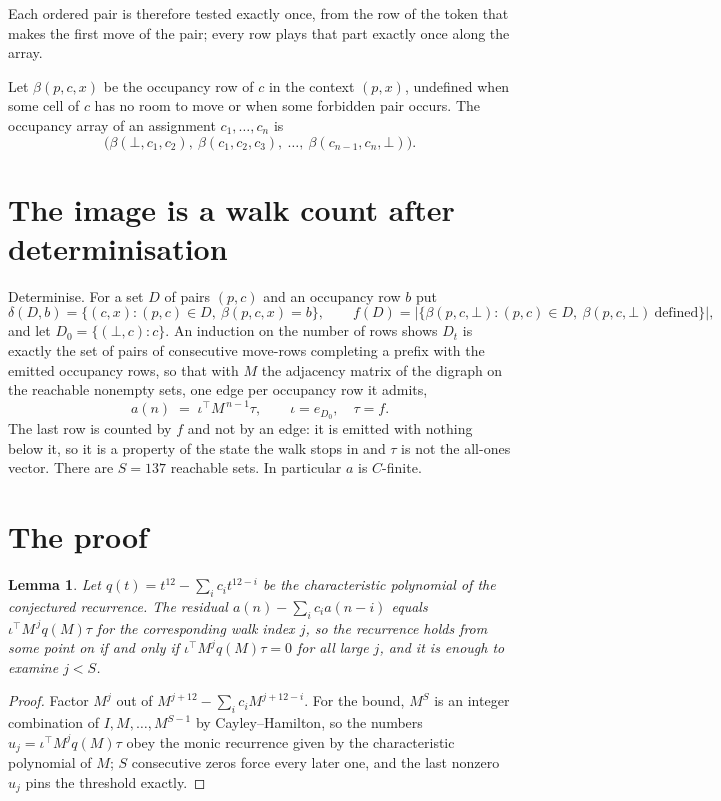 \documentclass[11pt,a4paper]{article}
\theoremstyle{plain}
\newtheorem{lemma}[theorem]{Lemma}
\theoremstyle{definition}
\begin{document}
Each ordered pair is therefore tested exactly once, from the row of the token that makes the
first move of the pair; every row plays that part exactly once along the array.

Let $\beta(p,c,x)$ be the occupancy row of $c$ in the context $(p,x)$, undefined when some
cell of $c$ has no room to move or when some forbidden pair occurs. The occupancy array of an
assignment $c_1,\dots,c_n$ is
\[
\bigl(\beta(\bot,c_1,c_2),\ \beta(c_1,c_2,c_3),\ \dots,\ \beta(c_{n-1},c_n,\bot)\bigr).
\]

\section{The image is a walk count after determinisation}

Determinise. For a set $D$ of pairs $(p,c)$ and an occupancy row $b$ put
\[
\delta(D,b)=\{(c,x):(p,c)\in D,\ \beta(p,c,x)=b\},\qquad
f(D)=\bigl|\{\beta(p,c,\bot):(p,c)\in D,\ \beta(p,c,\bot)\ \text{defined}\}\bigr| ,
\]
and let $D_0=\{(\bot,c):c\}$. An induction on the number of rows shows $D_t$ is exactly the
set of pairs of consecutive move-rows completing a prefix with the emitted occupancy rows, so
that with $M$ the adjacency matrix of the digraph on the reachable nonempty sets, one edge per
occupancy row it admits,
\[
a(n)\;=\;\iota^{\!\top}M^{\,n-1}\tau,\qquad \iota=e_{D_0},\quad \tau=f .
\]
The last row is counted by $f$ and not by an edge: it is emitted with nothing below it, so it
is a property of the state the walk stops in and $\tau$ is not the all-ones vector. There are
$S=137$ reachable sets. In particular $a$ is $C$-finite.

\section{The proof}

\begin{lemma}\label{lem:crit}
Let $q(t)=t^{12}-\sum_i c_it^{12-i}$ be the characteristic polynomial of the
conjectured recurrence. The residual $a(n)-\sum_ic_ia(n-i)$ equals
$\iota^{\!\top}M^{\,j}q(M)\tau$ for the corresponding walk index $j$, so the recurrence
holds from some point on if and only if $\iota^{\!\top}M^{j}q(M)\tau=0$ for all large $j$,
and it is enough to examine $j<S$.
\end{lemma}

\begin{proof}
Factor $M^{j}$ out of $M^{j+12}-\sum_ic_iM^{j+12-i}$. For the bound, $M^{S}$
is an integer combination of $I,M,\dots,M^{S-1}$ by Cayley--Hamilton, so the numbers
$u_j=\iota^{\!\top}M^{j}q(M)\tau$ obey the monic recurrence given by the characteristic
polynomial of $M$; $S$ consecutive zeros force every later one, and the last nonzero $u_j$
pins the threshold exactly.
\end{proof}
\end{document}
